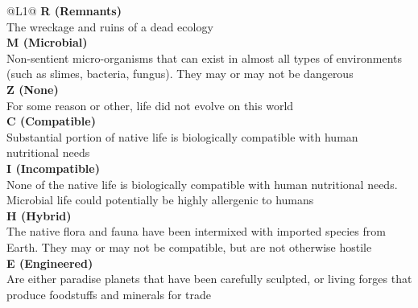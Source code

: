 \begin{redtable}{\linewidth}{@{}L{1}@{}}
  \textbf{R (Remnants)}\\
  The wreckage and ruins of a dead ecology\\
  \textbf{M (Microbial)}\\
  Non-sentient micro-organisms that can exist in almost all types of environments (such as slimes, bacteria, fungus). They may or may not be dangerous \\
  \textbf{Z (None)}\\
  For some reason or other, life did not evolve on this world\\
  \textbf{C (Compatible)}\\
  Substantial portion of native life is biologically compatible with human nutritional needs\\
  \textbf{I (Incompatible)}\\
  None of the native life is biologically compatible with human nutritional needs. Microbial life could potentially be highly allergenic to humans\\
  \textbf{H (Hybrid)}\\
  The native flora and fauna have been intermixed with imported species from Earth. They may or may not be compatible, but are not otherwise hostile\\
  \textbf{E (Engineered)}\\
  Are either paradise planets that have been carefully sculpted, or living forges that produce foodstuffs and minerals for trade\\
\end{redtable}
